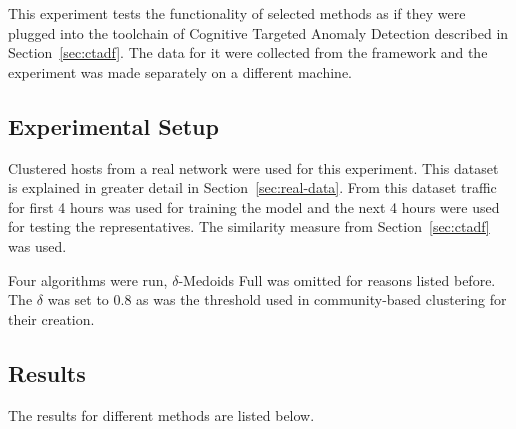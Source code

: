 \documentclass[thesis=B,english]{FITthesis}[2012/10/20]
\begin{document}
This experiment tests the functionality of selected methods as if they were plugged into the toolchain of Cognitive Targeted Anomaly Detection described in Section~\ref{sec:ctadf}.
The data for it were collected from the framework and the experiment was made separately on a different machine.

\subsection{Experimental Setup}
Clustered hosts from a real network were used for this experiment.
This dataset is explained in greater detail in Section~\ref{sec:real-data}.
From this dataset traffic for first 4 hours was used for training the model and the next 4 hours were used for testing the representatives.
The similarity measure from Section~\ref{sec:ctadf} was used.

Four algorithms were run, $\delta$-Medoids Full was omitted for reasons listed before.
The $\delta$ was set to 0.8 as was the threshold used in community-based clustering for their creation.

\subsection{Results}

The results for different methods are listed below.
\end{document}
